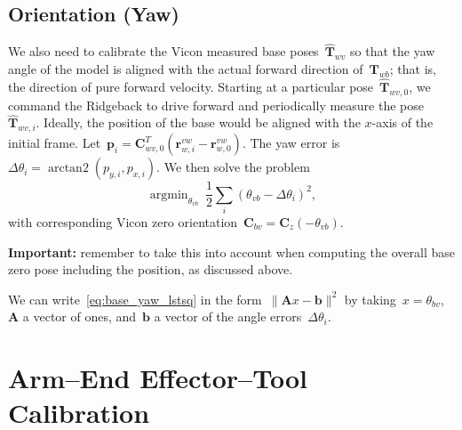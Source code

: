 \documentclass{article}
\DeclareMathOperator*{\argmin}{argmin}
\DeclareMathOperator*{\arctantwo}{\mathrm{arctan2}}
\begin{document}
\subsection{Orientation (Yaw)}

We also need to calibrate the Vicon measured base poses~$\hat{\bm{T}}_{wv}$ so
that the yaw angle of the model is aligned with the actual forward direction
of~$\bm{T}_{wb}$; that is, the direction of pure forward velocity. Starting at
a particular pose~$\hat{\bm{T}}_{wv,0}$, we command the Ridgeback to drive
forward and periodically measure the pose~$\hat{\bm{T}}_{wv,i}$. Ideally, the
position of the base would be aligned with the $x$-axis of the initial frame.
Let~$\bm{p}_i=\bm{C}_{wv,0}^T(\bm{r}^{vw}_{w,i}-\bm{r}^{vw}_{w,0})$. The yaw
error is~$\Delta\theta_i=\arctantwo(p_{y,i},p_{x,i})$. We then solve the problem
\begin{equation}\label{eq:base_yaw_lstsq}
  \argmin_{\theta_{vb}}\ \frac{1}{2}\sum_i(\theta_{vb}-\Delta\theta_i)^2,
\end{equation}
with corresponding Vicon zero orientation~$\bm{C}_{bv}=\bm{C}_z(-\theta_{vb})$.

\textbf{Important:} remember to take this into account when computing the
overall base zero pose including the position, as discussed above.

We can write~\eqref{eq:base_yaw_lstsq} in the
form~$\|\bm{A}x-\bm{b}\|^2$ by taking~$x=\theta_{bv}$,~$\bm{A}$ a vector of
ones, and~$\bm{b}$ a vector of the angle errors~$\Delta\theta_i$.

\section{Arm--End Effector--Tool Calibration}
\end{document}
